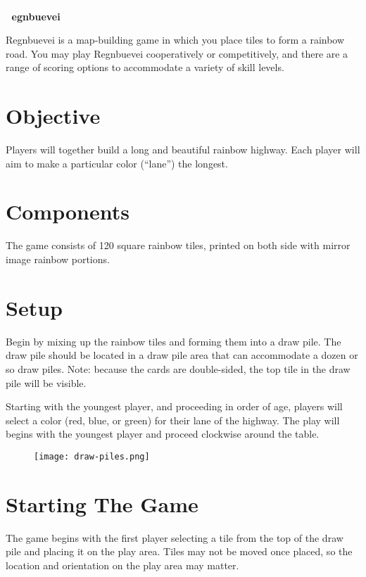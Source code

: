 \documentclass[twocolumn, 11pt]{article}
\begin{document}
{
  \textcolor{white}{.}\\
  \textcolor{white}{.}\Huge \bf\hspace{0.3em} egnbuevei
}

\vspace{1.7em}\noindent
Regnbuevei is a map-building game in which you place tiles to form a rainbow road.  You may play Regnbuevei cooperatively or competitively, and there are a range of scoring options to accommodate a variety of skill levels.

\section*{Objective}

Players will together build a long and beautiful rainbow highway.
Each player will aim to make a particular color (``lane'') the
longest.
\section*{Components}
The game consists of 120 square rainbow tiles, printed on both side
with mirror image rainbow portions.

\section*{Setup}

Begin by mixing up the rainbow tiles and forming them into a draw
pile. The draw pile should be located in a draw pile area that can
accommodate a dozen or so draw piles.  Note: because the cards are
double-sided, the top tile in the draw pile will be visible.

Starting with the youngest player, and proceeding in order of age,
players will select a color (red, blue, or green) for their lane of
the highway.  The play will begins with the youngest player and
proceed clockwise around the table.
\begin{figure}[h]
  \texttt{[image: draw-piles.png]}
\end{figure}
\section*{Starting The Game}
The game begins with the first player selecting a tile from the top of
the draw pile and placing it on the play area.  Tiles may not be moved
once placed, so the location and orientation on the play area may
matter.
\end{document}

